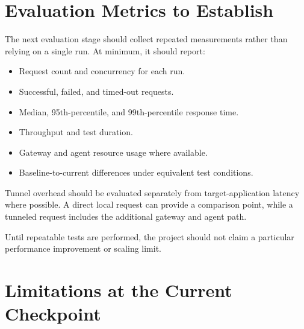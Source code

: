 \documentclass[11pt,a4paper,oneside]{report}
\begin{document}
\section{Evaluation Metrics to Establish}

The next evaluation stage should collect repeated measurements
rather than relying on a single run. At minimum, it should
report:

\begin{itemize}
  \item Request count and concurrency for each run.
  \item Successful, failed, and timed-out requests.
  \item Median, 95th-percentile, and 99th-percentile response time.
  \item Throughput and test duration.
  \item Gateway and agent resource usage where available.
  \item Baseline-to-current differences under equivalent
  test conditions.
\end{itemize}

Tunnel overhead should be evaluated separately from
target-application latency where possible. A direct local
request can provide a comparison point, while a tunneled
request includes the additional gateway and agent path.

Until repeatable tests are performed, the project should not
claim a particular performance improvement or scaling limit.

\section{Limitations at the Current Checkpoint}
\end{document}
